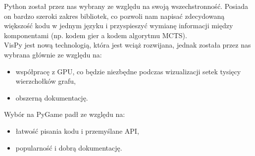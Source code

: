 \documentclass{article}
\begin{document}
	\noindent Python został przez nas wybrany ze względu na swoją wszechstronność. Posiada on bardzo szeroki zakres bibliotek, co pozwoli nam napisać zdecydowaną większość kodu w jednym języku i przyspieszyć wymianę informacji między komponentami (np. kodem gier a kodem algorytmu MCTS).\\
	
	\noindent VisPy jest nową technologią, która jest wciąż rozwijana, jednak została przez nas wybrana głównie ze względu na:
	\begin{itemize}
		\item współpracę z GPU, co będzie niezbędne podczas wizualizacji setek tysięcy wierzchołków grafu,
		\item obszerną dokumentację.\\
	\end{itemize}
	Wybór na PyGame padł ze względu na:
	\begin{itemize}
		\item łatwość pisania kodu i przemyślane API,
		\item popularność i dobrą dokumentację.\\
	\end{itemize}	
\end{document}
